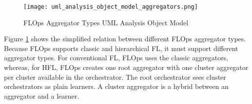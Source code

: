 \begin{figure}[h]
    \centering
    \texttt{[image: uml\_analysis\_object\_model\_aggregators.png]}
    \caption{FLOps Aggregator Types UML Analysis Object Model}
    \label{fig:uml_project_aggregators_analysis_object_model}
\end{figure}

Figure \ref{fig:uml_project_aggregators_analysis_object_model} shows the simplified relation between different FLOps aggregator types.
Because FLOps supports classic and hierarchical FL, it must support different aggregator types.
For conventional FL, FLOps uses the classic aggregators, whereas, for HFL, FLOps creates one root aggregator with one cluster aggregator per cluster available in the orchestrator.
The root orchestrator sees cluster orchestrators as plain learners.
A cluster aggregator is a hybrid between an aggregator and a learner.